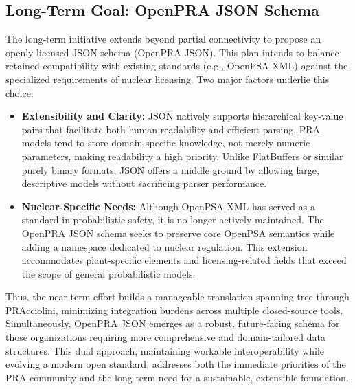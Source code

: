 \subsection{Long-Term Goal: OpenPRA JSON Schema}
The long-term initiative extends beyond partial connectivity to propose an openly licensed JSON schema (OpenPRA JSON). This plan intends to balance retained compatibility with existing standards (e.g., OpenPSA XML) against the specialized requirements of nuclear licensing. Two major factors underlie this choice:

\begin{itemize}
\item \textbf{Extensibility and Clarity:} JSON natively supports hierarchical key-value pairs that facilitate both human readability and efficient parsing. PRA models tend to store domain-specific knowledge, not merely numeric parameters, making readability a high priority. Unlike FlatBuffers or similar purely binary formats, JSON offers a middle ground by allowing large, descriptive models without sacrificing parser performance.
\item \textbf{Nuclear-Specific Needs:} Although OpenPSA XML has served as a standard in probabilistic safety, it is no longer actively maintained. The OpenPRA JSON schema seeks to preserve core OpenPSA semantics while adding a namespace dedicated to nuclear regulation. This extension accommodates plant-specific elements and licensing-related fields that exceed the scope of general probabilistic models.
\end{itemize}

Thus, the near-term effort builds a manageable translation spanning tree through PRAcciolini, minimizing integration burdens across multiple closed-source tools. Simultaneously, OpenPRA JSON emerges as a robust, future-facing schema for those organizations requiring more comprehensive and domain-tailored data structures. This dual approach, maintaining workable interoperability while evolving a modern open standard, addresses both the immediate priorities of the PRA community and the long-term need for a sustainable, extensible foundation.


